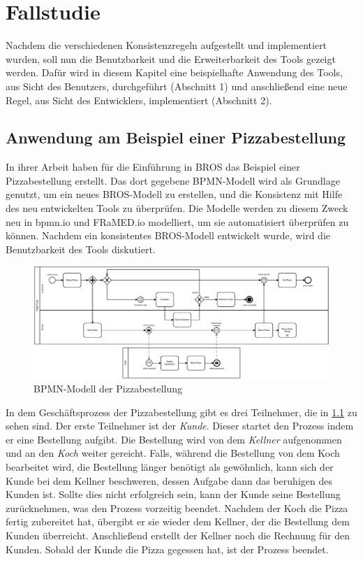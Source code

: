 \chapter{Fallstudie}
\label{chap:evaluation}

Nachdem die verschiedenen Konsistenzregeln aufgestellt und implementiert wurden, soll nun die Benutzbarkeit und die Erweiterbarkeit des Tools gezeigt werden.
Dafür wird in diesem Kapitel eine beispielhafte Anwendung des Tools, aus Sicht des Benutzers, durchgeführt (Abschnitt 1) und anschließend eine neue Regel, aus Sicht des Entwicklers, implementiert (Abschnitt 2).

\section{Anwendung am Beispiel einer Pizzabestellung}

In ihrer Arbeit haben \cite{Schoen} für die Einführung in BROS das Beispiel einer Pizzabestellung erstellt.
Das dort gegebene BPMN-Modell wird als Grundlage genutzt, um ein neues BROS-Modell zu erstellen, und die Konsistenz mit Hilfe des neu entwickelten Tools zu überprüfen.
Die Modelle werden zu diesem Zweck neu in bpmn.io und FRaMED.io modelliert, um sie automatisiert überprüfen zu können.
Nachdem ein konsistentes BROS-Modell entwickelt wurde, wird die Benutzbarkeit des Tools diskutiert.

\begin{figure}
    \centering
    \includegraphics[width=\textwidth,keepaspectratio]{../images/example/bpmn.pdf}%
    \caption{BPMN-Modell der Pizzabestellung}%
    \label{fig:pizzaBpmn}
\end{figure}

In dem Geschäftsprozess der Pizzabestellung gibt es drei Teilnehmer, die in \cref{fig:pizzaBpmn} zu sehen sind.
Der erste Teilnehmer ist der \emph{Kunde}.
Dieser startet den Prozess indem er eine Bestellung aufgibt.
Die Bestellung wird von dem \emph{Kellner} aufgenommen und an den \emph{Koch} weiter gereicht.
Falls, während die Bestellung von dem Koch bearbeitet wird, die Bestellung länger benötigt als gewöhnlich, kann sich der Kunde bei dem Kellner beschweren, dessen Aufgabe dann das beruhigen des Kunden ist.
Sollte dies nicht erfolgreich sein, kann der Kunde seine Bestellung zurücknehmen, was den Prozess vorzeitig beendet.
Nachdem der Koch die Pizza fertig zubereitet hat, übergibt er sie wieder dem Kellner, der die Bestellung dem Kunden überreicht.
Anschließend erstellt der Kellner noch die Rechnung für den Kunden.
Sobald der Kunde die Pizza gegessen hat, ist der Prozess beendet.

